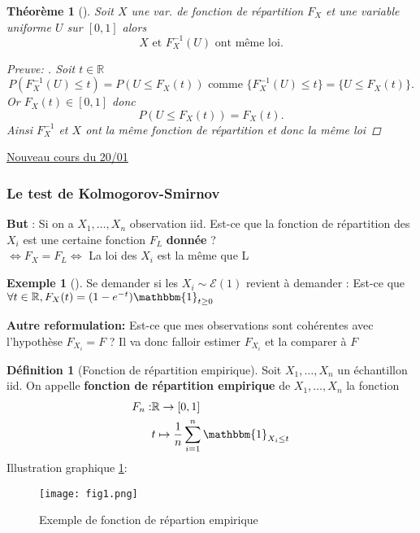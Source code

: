 \documentclass{article}
\theoremstyle{plain}%
\newtheorem{thm}{Théorème}[section]
\theoremstyle{definition}
\newtheorem{defn}{Définition}[section]
\newtheorem{exmp}{Exemple}[section]
\theoremstyle{remark}
\begin{document}
\begin{thm}[]
    Soit $ X $ une var. de fonction de répartition $ F_X $ et une variable uniforme $ U $ sur $ [0,1] $ alors 
    \[
        X \text{ et } F_X^{-1}(U) \text{ ont même loi}
    .\]

    \begin{proof}[Preuve: ]
        Soit $ t \in \mathbb{R} $ 
        \[
            P(F_X^{-1}(U) \leq t) = P(U \leq F_X(t)) \text{ comme } \{F_X^{-1} (U) \leq t\} = \{U \leq F_X(t)\}
        .\]
        Or $ F_X(t) \in [0,1] $ donc 
        \[
            P(U \leq F_X(t)) = F_X(t)
        .\]
        Ainsi $ F_X^{-1} $ et $ X $ ont la même fonction de répartition et donc la même loi
    \end{proof}
\end{thm}

\underline{Nouveau cours du 20/01} \\

\subsubsection{Le test de Kolmogorov-Smirnov}

\textbf{But} : Si on a $ X_1, \dots, X_n $ observation iid. Est-ce que la fonction de répartition des $ X_i $ est une certaine fonction $ F_L $ \textbf{donnée} ? \\
$ \Leftrightarrow F_X = F_L \Leftrightarrow $  La loi des $ X_i $ est la même que L \\

\begin{exmp}[]
    Se demander si les $  X_i \sim \mathcal{E}(1) $ revient à demander : Est-ce que $ \forall t \in \mathbb{R}, F_X(t) = (1 - e^{-t}) \mathbbm{1}_{t \geq 0} $ 
\end{exmp}

\textbf{Autre reformulation:} Est-ce que mes observations sont cohérentes avec l'hypothèse $ F_{X_i}= F $ ? Il va donc falloir estimer $ F_{X_i} $ et la comparer à $ F $ 

\begin{defn}[Fonction de répartition empirique]
    Soit $ X_1, \dots, X_n $ un échantillon iid. On appelle \textbf{fonction de répartition empirique} de $ X_1, \dots, X_n $ la fonction 
    \begin{align*}
        F_n :& \mathbb{R} \to [0,1] \\
            & t \mapsto \frac{1}{n}\sum_{i=1}^{n} \mathbbm{1}_{X_i \leq t}
    \end{align*}
    Illustration graphique \ref{fig1}:
    \begin{figure}[!htbp]
        \centering
        \texttt{[image: fig1.png]}
        \caption{Exemple de fonction de répartion empirique}
        \label{fig1}
    \end{figure}
\end{defn}
\end{document}
